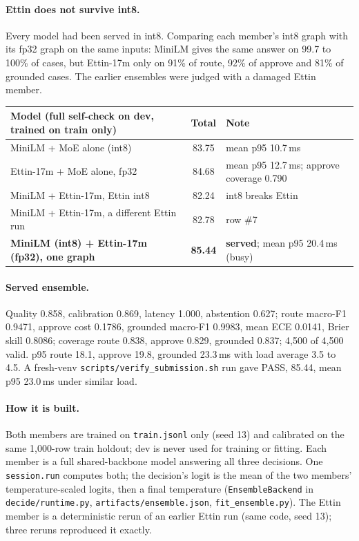 \documentclass[10pt,a4paper]{article}
\begin{document}
\paragraph{Ettin does not survive int8.} Every model had been served in int8. Comparing each
member's int8 graph with its fp32 graph on the same inputs: MiniLM gives the same answer on
99.7 to 100\% of cases, but Ettin-17m only on 91\% of route, 92\% of approve and 81\% of
grounded cases. The earlier ensembles were judged with a damaged Ettin member.

\begin{center}
\begin{tabular}{lcl}
\toprule
Model (full self-check on dev, trained on train only) & Total & Note \\
\midrule
MiniLM + MoE alone (int8) & 83.75 & mean p95 10.7\,ms \\
Ettin-17m + MoE alone, fp32 & 84.68 & mean p95 12.7\,ms; approve coverage 0.790 \\
MiniLM + Ettin-17m, Ettin int8 & 82.24 & int8 breaks Ettin \\
MiniLM + Ettin-17m, a different Ettin run & 82.78 & row \#7 \\
\rowcolor{served} \textbf{MiniLM (int8) + Ettin-17m (fp32), one graph} & \textbf{85.44} & \textbf{served}; mean p95 20.4\,ms (busy) \\
\bottomrule
\end{tabular}
\end{center}

\paragraph{Served ensemble.} Quality 0.858, calibration 0.869, latency 1.000, abstention
0.627; route macro-F1 0.9471, approve cost 0.1786, grounded macro-F1 0.9983, mean ECE
0.0141, Brier skill 0.8086; coverage route 0.838, approve 0.829, grounded 0.837;
4{,}500 of 4{,}500 valid. p95 route 18.1, approve 19.8, grounded 23.3\,ms with load average
3.5 to 4.5. A fresh-venv \texttt{scripts/verify\_submission.sh} run gave PASS, 85.44, mean
p95 23.0\,ms under similar load.

\paragraph{How it is built.} Both members are trained on \texttt{train.jsonl} only (seed 13)
and calibrated on the same 1{,}000-row train holdout; dev is never used for training or
fitting. Each member is a full shared-backbone model answering all three decisions. One
\texttt{session.run} computes both; the decision's logit is the mean of the two members'
temperature-scaled logits, then a final temperature (\texttt{EnsembleBackend} in
\texttt{decide/runtime.py}, \texttt{artifacts/ensemble.json}, \texttt{fit\_ensemble.py}).
The Ettin member is a deterministic rerun of an earlier Ettin run (same code, seed 13);
three reruns reproduced it exactly.
\end{document}
